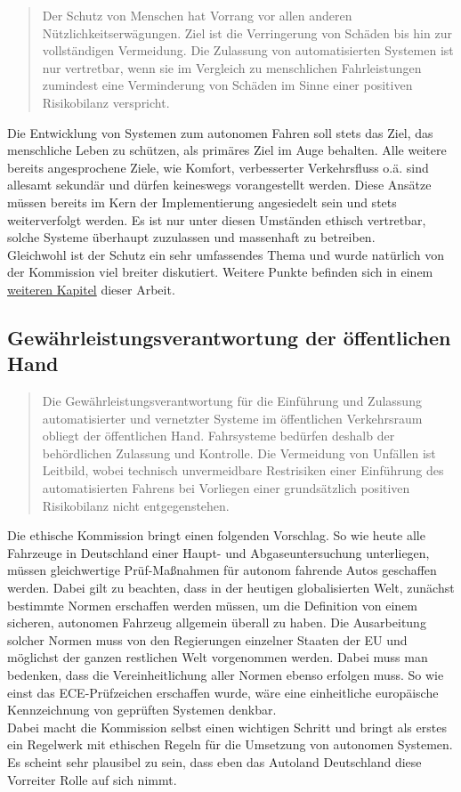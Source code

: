 \documentclass[twoside,a4paper,12pt]{article}
\begin{document}
\begin{quote}
\glqq
Der Schutz von Menschen hat Vorrang vor allen anderen Nützlichkeitserwägungen. Ziel
ist die Verringerung von Schäden bis hin zur vollständigen Vermeidung. Die Zulassung
von automatisierten Systemen ist nur vertretbar, wenn sie im Vergleich zu menschlichen
Fahrleistungen zumindest eine Verminderung von Schäden im Sinne einer positiven Risikobilanz verspricht.\grqq\mbox{~\cite[S. 10]{ek}}
\end{quote}
Die Entwicklung von Systemen zum autonomen Fahren soll stets das Ziel, das menschliche Leben zu schützen, 
als primäres Ziel im Auge behalten. Alle weitere bereits angesprochene Ziele, wie Komfort, verbesserter Verkehrsfluss o.ä. sind allesamt sekundär 
und dürfen keineswegs vorangestellt werden. Diese Ansätze müssen bereits im Kern der Implementierung angesiedelt sein und stets weiterverfolgt werden. Es ist nur unter diesen Umständen ethisch vertretbar, solche Systeme überhaupt zuzulassen und massenhaft zu betreiben. \\ Gleichwohl ist der Schutz ein sehr umfassendes Thema und wurde natürlich von der Kommission viel breiter diskutiert. Weitere Punkte  befinden sich in einem  \hyperlink{target1}{weiteren Kapitel}  dieser Arbeit.

\subsection{Gewährleistungsverantwortung der öffentlichen Hand} \label{GewaehrleistungsverantwortungDerOeffentlichenHand}

\begin{quote}
\glqq
Die Gewährleistungsverantwortung für die Einführung und Zulassung automatisierter
und vernetzter Systeme im öffentlichen Verkehrsraum obliegt der öffentlichen Hand.
Fahrsysteme bedürfen deshalb der behördlichen Zulassung und Kontrolle. Die Vermeidung von Unfällen ist Leitbild, wobei technisch 
unvermeidbare Restrisiken einer Einführung des automatisierten Fahrens bei Vorliegen einer grundsätzlich positiven Risikobilanz
nicht entgegenstehen.\grqq\mbox{~\cite[S. 10]{ek}}
\end{quote}
Die ethische Kommission bringt einen folgenden Vorschlag. So wie heute alle Fahrzeuge in Deutschland einer Haupt- und Abgaseuntersuchung unterliegen, müssen gleichwertige Prüf-Maßnahmen für autonom fahrende Autos geschaffen werden. Dabei gilt zu beachten, dass in der heutigen globalisierten Welt, zunächst bestimmte Normen erschaffen werden müssen, um die Definition von einem sicheren, autonomen Fahrzeug allgemein überall zu haben. Die Ausarbeitung solcher Normen muss von den Regierungen einzelner Staaten der EU und möglichst der ganzen restlichen Welt vorgenommen werden. Dabei muss man bedenken, dass die Vereinheitlichung aller Normen ebenso erfolgen muss. So wie einst das ECE-Prüfzeichen erschaffen wurde, wäre eine einheitliche europäische Kennzeichnung von geprüften Systemen denkbar.\\
Dabei macht die Kommission selbst einen wichtigen Schritt und bringt als erstes ein Regelwerk mit ethischen Regeln für die Umsetzung von autonomen Systemen. Es scheint sehr plausibel zu sein, dass eben das Autoland Deutschland diese Vorreiter Rolle auf sich nimmt. 
\end{document}
